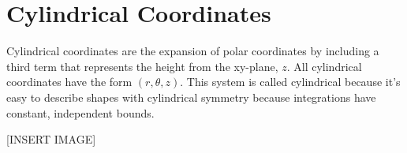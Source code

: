 \section{Cylindrical Coordinates}
\noindent
Cylindrical coordinates are the expansion of polar coordinates by including a third term that represents the height from the xy-plane, $z$. All cylindrical coordinates have the form $(r,\theta,z)$. This system is called cylindrical because it’s easy to describe shapes with cylindrical symmetry because integrations have constant, independent bounds.

[INSERT IMAGE]


